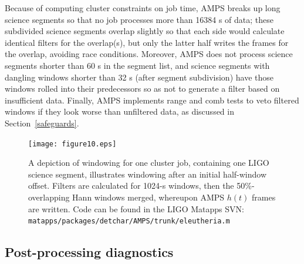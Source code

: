             Because of computing cluster constraints on job time, AMPS breaks up long science segments so that no job processes more than 16384 s of data; these subdivided science segments overlap slightly so that each side would calculate identical filters for the overlap(s), but only the latter half writes the frames for the overlap, avoiding race conditions. Moreover, AMPS does not process science segments shorter than 60 s in the segment list, and science segments with dangling windows shorter than 32 s (after segment subdivision) have those windows rolled into their predecessors so as not to generate a filter based on insufficient data. Finally, AMPS implements range and comb tests to veto filtered windows if they look worse than unfiltered data, as discussed in Section~\ref{safeguards}. 

\begin{figure}
\begin{center}
\texttt{[image: figure10.eps]}
\caption{A depiction of windowing for one cluster job, containing one LIGO science segment, illustrates windowing after an initial half-window offset. Filters are calculated for 1024-s windows, then the 50\%-overlapping Hann windows merged, whereupon AMPS $h(t)$ frames are written. Code can be found in the LIGO Matapps SVN: \texttt{matapps/packages/detchar/AMPS/trunk/eleutheria.m}}
\label{windowingScience}
\end{center}
\end{figure}


        \subsection{Post-processing diagnostics}
        \label{diagnostics}
 

